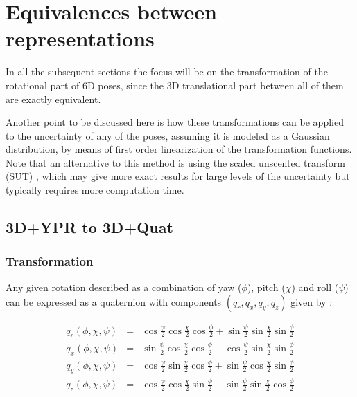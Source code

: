 \documentclass[a4paper,10pt]{report}
\begin{document}

\chapter{Equivalences between representations}

In all the subsequent sections the focus will be on the transformation of the rotational part of 6D poses, since
the 3D translational part between all of them are exactly equivalent. 

Another point to be discussed here is how these transformations can be applied to the uncertainty 
of any of the poses, 
assuming it is modeled as a Gaussian distribution, by means of first 
order linearization of the transformation functions. 
Note that an alternative to this method is using the scaled unscented 
transform (SUT) \cite{julier2002sut}, which may give more exact results for 
large levels of the uncertainty but typically requires more computation time.

\section{3D+YPR to 3D+Quat }
\label{sect:ypr2quat}

\subsection{Transformation}

Any given rotation described as a combination of yaw ($\phi$),
pitch ($\chi$) and roll ($\psi$) can
be expressed as a quaternion with components $(q_r, q_x,q_y,q_z)$ 
given by \cite{horn2001some}:

\begin{eqnarray}
  q_r(\phi,\chi,\psi) &=& \cos\frac{\psi}{2} \cos\frac{\chi}{2}  \cos\frac{\phi}{2}  + 
  \sin\frac{\psi}{2} \sin\frac{\chi}{2} \sin\frac{\phi}{2}    \\
  q_x(\phi,\chi,\psi) &=& \sin\frac{\psi}{2} \cos\frac{\chi}{2}  \cos\frac{\phi}{2}  - 
  \cos\frac{\psi}{2} \sin\frac{\chi}{2} \sin\frac{\phi}{2}    \\
  q_y(\phi,\chi,\psi) &=& \cos\frac{\psi}{2} \sin\frac{\chi}{2}  \cos\frac{\phi}{2}  + 
  \sin\frac{\psi}{2} \cos\frac{\chi}{2} \sin\frac{\phi}{2}    \\
  q_z(\phi,\chi,\psi) &=& \cos\frac{\psi}{2} \cos\frac{\chi}{2}  \sin\frac{\phi}{2}  -
  \sin\frac{\psi}{2} \sin\frac{\chi}{2} \cos\frac{\phi}{2}   
\end{eqnarray}
\end{document}
